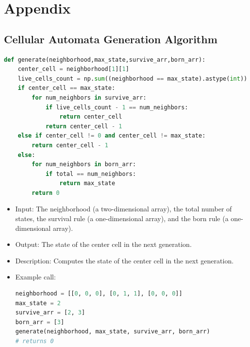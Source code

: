 \documentclass[12pt]{article}
\numberwithin{figure}{section} %
\begin{document}
\newpage
\section{Appendix}
\subsection{Cellular Automata Generation Algorithm}
\label{subsection:Cellular Automata Generation Algorithm}
\begin{lstlisting}[language=Python]
def generate(neighborhood,max_state,survive_arr,born_arr):
    center_cell = neighborhood[1][1]
    live_cells_count = np.sum((neighborhood == max_state).astype(int))
    if center_cell == max_state: 
        for num_neighbors in survive_arr:
            if live_cells_count - 1 == num_neighbors: 
                return center_cell 
            return center_cell - 1
    else if center_cell != 0 and center_cell != max_state:
        return center_cell - 1
    else:
        for num_neighbors in born_arr: 
            if total == num_neighbors:
                return max_state 
        return 0
\end{lstlisting}
\vspace{-1.5em}
\begin{itemize}[leftmargin = 0.5cm, topsep=0pt,itemsep=-1ex,partopsep=1ex,parsep=1ex]
\item Input: The neighborhood (a two-dimensional array), the total number of states, the survival rule (a one-dimensional array), and the born rule (a one-dimensional array). 
\item Output: The state of the center cell in the next generation.  
\item Description: Computes the state of the center cell in the next generation. 
\item Example call: 
\begin{lstlisting}[language = Python]
neighborhood = [[0, 0, 0], [0, 1, 1], [0, 0, 0]]
max_state = 2
survive_arr = [2, 3]
born_arr = [3]
generate(neighborhood, max_state, survive_arr, born_arr) 
# returns 0
\end{lstlisting}
\end{itemize}
\end{document}
